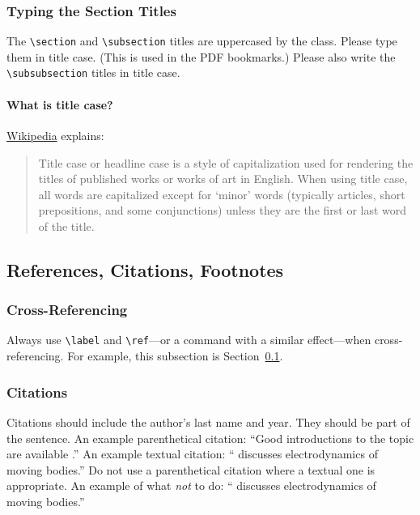 \documentclass{uai2023} %
\begin{document}
\subsubsection{Typing the Section Titles}
The \verb|\section| and \verb|\subsection| titles are uppercased by the class.
Please type them in title case.
(This is used in the PDF bookmarks.)
Please also write the \verb|\subsubsection| titles in title case.

\paragraph{What is title case?}
\href{https://en.wikipedia.org/wiki/Title_case}{Wikipedia} explains:
\begin{quote}
    Title case or headline case is a style of capitalization used for rendering the titles of published works or works of art in English.
    When using title case, all words are capitalized except for ‘minor’ words (typically articles, short prepositions, and some conjunctions) unless they are the first or last word of the title.
\end{quote}

\subsection{References, Citations, Footnotes}\label{sec:etc}
\subsubsection{Cross-Referencing}
Always use \verb|\label| and \verb|\ref|—or a command with a similar effect—when cross-referencing.
For example, this subsection is Section~\ref{sec:etc}.

\subsubsection{Citations}
Citations should include the author's last name and year.
They should be part of the sentence.
An example parenthetical citation: “Good introductions to the topic are available \citep{latexcompanion}.”
An example textual citation: “\citet{einstein} discusses electrodynamics of moving bodies.”
Do not use a parenthetical citation where a textual one is appropriate.
An example of what \emph{not} to do: “\citep{einstein} discusses electrodynamics of moving bodies.”
\end{document}
